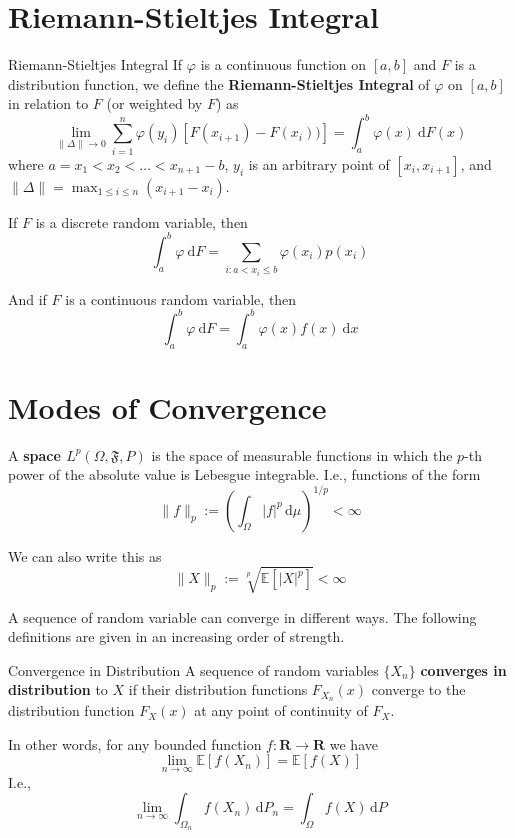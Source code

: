\section{Riemann-Stieltjes Integral}

\begin{definition}[]{Riemann-Stieltjes Integral}{}
	If $\varphi$ is a continuous function on $[a,b]$ and $F$ is a distribution function, we define the \textbf{Riemann-Stieltjes Integral} of $\varphi$ on $[a,b]$ in relation to $F$ (or weighted by $F$) as
	\[
		\lim_{\| \Delta \| \to 0} \sum_{i=1}^n \varphi(y_i)[F(x_{i+1}) - F(x_i))] = \int_a^b \varphi(x) ~\mathrm{d}F(x)
	\]
	where $a = x_1 < x_2 < \ldots < x_{n+1} - b$, $y_i$ is an arbitrary point of $[x_i, x_{i+1}]$, and $\| \Delta \| = \max_{1 \leq i \leq n} (x_{i+1} - x_i)$.
\end{definition}

If $F$ is a discrete random variable, then
\[
	\int_a^b \varphi ~\mathrm{d}F = \sum_{i: a < x_i \leq b} \varphi(x_i) p(x_i)
\]

And if $F$ is a continuous random variable, then
\[
	\int_a^b \varphi ~\mathrm{d}F = \int_a^b \varphi(x) f(x) ~\mathrm{d}x
\]

\section{Modes of Convergence}

\begin{definition}[]{}{}
	A \textbf{space $L^p (\Omega, \mathfrak{F}, P)$} is the space of measurable functions in which the $p$-th power of the absolute value is Lebesgue integrable. I.e., functions of the form
	\[
		\| f \|_p := \left( \int_\Omega |f|^p \, \mathrm{d}\mu \right)^{1/p} < \infty
	\]

	We can also write this as
	\[
		\| X \|_p := \sqrt[p]{\mathbb{E}[|X|^p]} < \infty
	\]
\end{definition}

A sequence of random variable can converge in different ways. The following definitions are given in an increasing order of strength.

\begin{definition}[]{Convergence in Distribution}{}
	A sequence of random variables $\{ X_n \}$ \textbf{converges in distribution} to $X$ if their distribution functions $F_{X_n}(x)$ converge to the distribution function $F_X(x)$ at any point of continuity of $F_X$.
	
	In other words, for any bounded function $f : \textbf{R} \longrightarrow \textbf{R}$ we have
	\[
		\lim_{n \to \infty} \mathbb{E}[f(X_n)] = \mathbb{E}[f(X)]
	\]
	I.e.,
	\[
		\lim_{n \to \infty} \int_{\Omega_n} f(X_n) \, \mathrm{d}P_n = \int_{\Omega} f(X) \, \mathrm{d}P
	\]
\end{definition}


